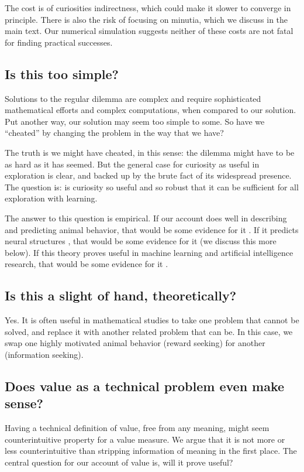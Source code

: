 The cost is of curiosities indirectness, which could make it slower to converge in principle. There is also the risk of focusing on minutia, which we discuss in the main text. Our numerical simulation suggests neither of these costs are not fatal for finding practical successes.


\subsection*{Is this too simple?}
Solutions to the regular dilemma are complex and require sophisticated mathematical efforts and complex computations, when compared to our solution. Put another way, our solution may seem too simple to some. So have we ``cheated'' by changing the problem in the way that we have?

The truth is we might have cheated, in this sense: the dilemma might have to be as hard as it has seemed. But the general case for curiosity as useful in exploration is clear, and backed up by the brute fact of its widespread presence. The question is: is curiosity so useful and so robust that it can be sufficient for all exploration with learning. 

The answer to this question is empirical. If our account does well in describing and predicting animal behavior, that would be some evidence for it \cite{Sumner2019,Wang2019,Jaegle2019,Gottlieb2018,Kidd2015,Berlyne1950,Colas2020a,Rahnev2018,Wilson2020,CogliatiDezza2017b,Berger-Tal2014}. If it predicts neural structures \cite{Cisek2019,Kobayashi2019}, that would be some evidence for it (we discuss this more below). If this theory proves useful in machine learning and artificial intelligence research, that would be some evidence for it \cite{Burda2018,Schmidhuber1991,deAbril2018,Fister2019,Lehman2011a,Stanley2004a,Colas2020,Cully2015,Wilson2020,Pathak2019}. 


\subsection*{Is this a slight of hand, theoretically?}
Yes. It is often useful in mathematical studies to take one problem that cannot be solved, and replace it with another related problem that can be. In this case, we swap one highly motivated animal behavior (reward seeking) for another (information seeking).


\subsection*{Does value as a technical problem even make sense?}
Having a technical definition of value, free from any meaning, might seem counterintuitive property for a value measure. We argue that it is not more or less counterintuitive than stripping information of meaning in the first  place. The central question for our account of value is, will it prove useful? 


